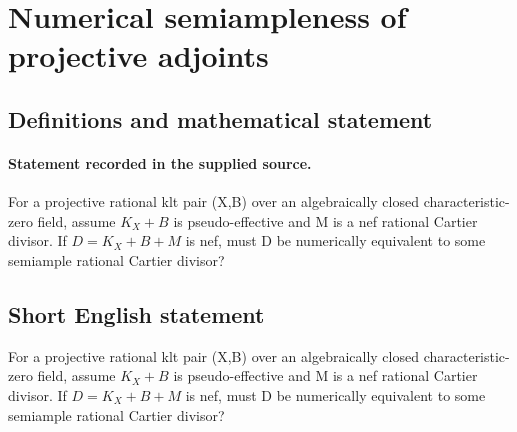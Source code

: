 \documentclass[11pt]{article}
\begin{document}
\section*{Numerical semiampleness of projective adjoints}\label{statement}
\subsection{Definitions and mathematical statement}
\paragraph{Statement recorded in the supplied source.}
For a projective rational klt pair (X,B) over an algebraically closed characteristic-zero field, assume $K_X+B$ is pseudo-effective and M is a nef rational Cartier divisor. If $D=K_X+B+M$ is nef, must D be numerically equivalent to some semiample rational Cartier divisor?
\subsection{Short English statement}
For a projective rational klt pair (X,B) over an algebraically closed characteristic-zero field, assume $K_X+B$ is pseudo-effective and M is a nef rational Cartier divisor. If $D=K_X+B+M$ is nef, must D be numerically equivalent to some semiample rational Cartier divisor?
\end{document}
